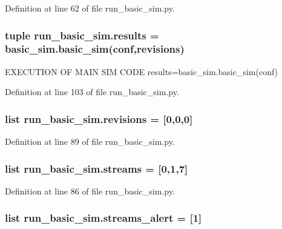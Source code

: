 Definition at line 62 of file run\-\_\-basic\-\_\-sim.\-py.

\hypertarget{namespacerun__basic__sim_a1bf560184f22725eb4ccb144ad176478}{
\subsubsection[{results}]{\setlength{\rightskip}{0pt plus 5cm}tuple run\-\_\-basic\-\_\-sim.\-results = basic\-\_\-sim.\-basic\-\_\-sim({\bf conf},{\bf revisions})}}\label{namespacerun__basic__sim_a1bf560184f22725eb4ccb144ad176478}


E\-X\-E\-C\-U\-T\-I\-O\-N O\-F M\-A\-I\-N S\-I\-M C\-O\-D\-E results=basic\-\_\-sim.\-basic\-\_\-sim(conf) 



Definition at line 103 of file run\-\_\-basic\-\_\-sim.\-py.

\hypertarget{namespacerun__basic__sim_a10341d73d6ae4054f329f8df62c3d883}{
\subsubsection[{revisions}]{\setlength{\rightskip}{0pt plus 5cm}list run\-\_\-basic\-\_\-sim.\-revisions = \mbox{[}0,0,0\mbox{]}}}\label{namespacerun__basic__sim_a10341d73d6ae4054f329f8df62c3d883}


Definition at line 89 of file run\-\_\-basic\-\_\-sim.\-py.

\hypertarget{namespacerun__basic__sim_a69d19ea95cd33b0c8247e0329ad681fd}{
\subsubsection[{streams}]{\setlength{\rightskip}{0pt plus 5cm}list run\-\_\-basic\-\_\-sim.\-streams = \mbox{[}0,1,7\mbox{]}}}\label{namespacerun__basic__sim_a69d19ea95cd33b0c8247e0329ad681fd}


Definition at line 86 of file run\-\_\-basic\-\_\-sim.\-py.

\hypertarget{namespacerun__basic__sim_adacbf2216b90ed8744cd74181ab5e1fe}{
\subsubsection[{streams\-\_\-alert}]{\setlength{\rightskip}{0pt plus 5cm}list run\-\_\-basic\-\_\-sim.\-streams\-\_\-alert = \mbox{[}1\mbox{]}}}\label{namespacerun__basic__sim_adacbf2216b90ed8744cd74181ab5e1fe}


